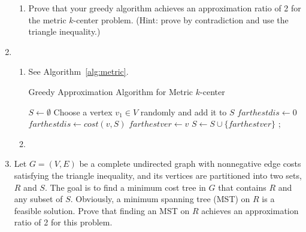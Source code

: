 \documentclass[12pt,a4paper]{article}
\makeatletter
\newtheorem*{solution}{Solution}
\theoremstyle{definition}
\renewenvironment{solution}[1][Solution] {\par\pushQED{\qed}\normalfont\topsep6\p@\@plus6\p@\relax\trivlist\item[\hskip\labelsep\bfseries#1\@addpunct{.}]\ignorespaces}{\popQED\endtrivlist\@endpefalse} \makeatother
\makeatother
\begin{document}
\begin{enumerate}
\begin{enumerate}
        \item
        Prove that your greedy algorithm achieves an approximation ratio of 2 for the metric $k$-center problem. (Hint: prove by contradiction and use the triangle inequality.)
    \end{enumerate}
    \begin{solution}
        \begin{enumerate}
            \item  See Algorithm~\ref{alg:metric}.\newline 
            \begin{minipage}{0.8\textwidth}
                \centering
                \begin{algorithm}[H]
                \caption{Greedy Approximation Algorithm for Metric $k$-center}\label{alg:metric}
                \BlankLine
                $S\leftarrow\emptyset$\;
                Choose a vertex $v_1\in V$ randomly and add it to $S$\;
                 {
                    $farthestdis\leftarrow0$\;
                     {
                         {
                            $farthestdis\leftarrow cost(v,S)$\;
                            $farthestver\leftarrow v$\;
                        }   
                    }
                    $S\leftarrow S\cup \{farthestver\}$\;
                }
                ;
                \end{algorithm}
                \end{minipage}
                \item 
        \end{enumerate}
    \end{solution}
    \item
    Let $G = (V, E)$ be a complete undirected graph with nonnegative edge costs satisfying the triangle inequality, and its vertices are partitioned into two sets, $R$ and $S$. The goal is to find a minimum cost tree in $G$ that contains $R$ and any subset of $S$. Obviously, a minimum spanning tree (MST) on $R$ is a feasible solution. Prove that finding an MST on $R$ achieves an approximation ratio of 2 for this problem.


\end{enumerate}
\end{document}
